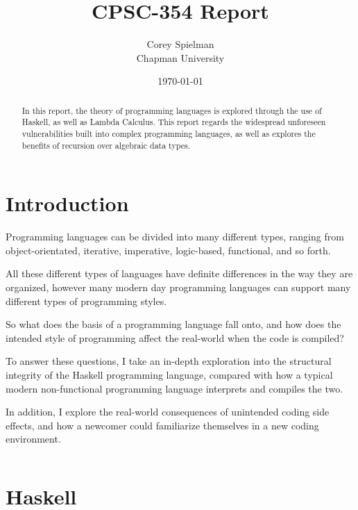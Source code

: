 \documentclass{article}
\title{CPSC-354 Report}
\author{Corey Spielman  \\ \color{red}Chapman University}
\date{\today}
\begin{document}
\maketitle

\begin{abstract}
In this report, the theory of programming languages is explored through the use of Haskell, as well as Lambda Calculus. This report regards the widespread unforeseen vulnerabilities built into complex programming languages, as well as explores the benefits of recursion over algebraic data types.
\end{abstract}

\tableofcontents

\medskip\section{Introduction}\label{intro}

\hspace{\parindent} 

Programming languages can be divided into many different types, ranging from object-orientated, iterative, imperative, logic-based, functional, and so forth. 

\medskip\noindent
All these different types of languages have definite differences in the way they are organized, however many modern day programming languages can support many different types of programming styles. 

\medskip\noindent
So what does the basis of a programming language fall onto, and how does the intended style of programming affect the real-world when the code is compiled?  

\medskip\noindent
To answer these questions, I take an in-depth exploration into the structural integrity of the Haskell programming language, compared with how a typical modern non-functional programming language interprets and compiles the two. 

\medskip\noindent
In addition, I explore the real-world consequences of unintended coding side effects, and how a newcomer could familiarize themselves in a new coding environment. 

\medskip\medskip
\begin{lstlisting}
\end{lstlisting}

\section{Haskell}\label{haskell}
\medskip\medskip
\end{document}
